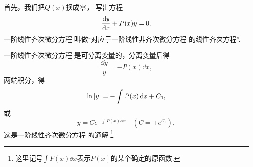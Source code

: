 首先，我们把\(Q(x)\)换成零，
写出方程\begin{equation}\label{equation:微分方程.一阶线性齐次微分方程}
	\dv{y}{x} + P(x) y = 0.
\end{equation}
一阶线性齐次微分方程 
叫做“对应于一阶线性非齐次微分方程  的线性齐次方程”.

一阶线性齐次微分方程  是可分离变量的，分离变量后得\begin{equation*}
	\frac{\dd{y}}{y} = -P(x) \dd{x},
\end{equation*}
两端积分，得\begin{equation*}
	\ln{\abs{y}} = -\int P(x) \dd{x} + C_1,
\end{equation*}
或\begin{equation*}
	y = C e^{ -\int P(x) \dd{x} }
	\quad(C = \pm e^{C_1}),
\end{equation*}
这是一阶线性齐次微分方程  的通解
\footnote{
	这里记号\(\int P(x) \dd{x}\)表示\(P(x)\)的某个确定的原函数.
}.

